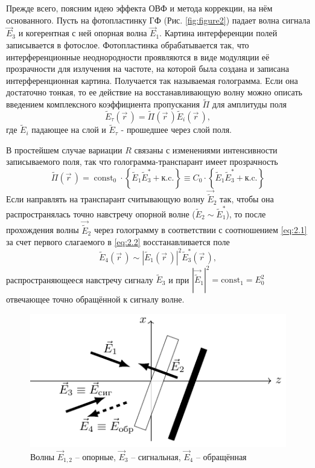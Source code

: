 Прежде всего, поясним идею эффекта ОВФ и метода коррекции, на нём основанного. Пусть на фотопластинку ГФ (Рис. \ref{fig:figure2}) падает волна сигнала $\vec{E}_3$ и когерентная с ней опорная волна $\vec{E}_1$. Картина интерференции полей записывается в фотослое. Фотопластинка обрабатывается так, что интерференционные неоднородности проявляются в виде модуляции её прозрачности для излучения на частоте, на которой была создана и записана интерференционная картина. Получается так называемая голограмма. Если она достаточно тонкая, то ее действие на восстанавливающую волну можно описать введением комплексного коэффициента пропускания $\tilde{\Pi}$ для амплитуды поля
\begin{equation}
	\label{eq:2.1}
\tilde{E}_{\tau}(\vec{r}\,)=\tilde{\Pi}(\vec{r}\,) \tilde{E}_{i}(\vec{r}\,),
\end{equation}
где $ \tilde{E}_{i}$  падающее на слой и $ \tilde{E}_{\tau}$ - прошедшее через слой поля.

В простейшем случае вариации $R$ связаны с изменениями интенсивности записываемого поля, так что голограмма-транспарант имеет прозрачность
\begin{equation}
	\label{eq:2.2}
	\tilde{\Pi}(\vec{r}\,)=\operatorname{const}_{0} \cdot\left\{\tilde{E}_{1} \tilde{E}_{3}^{*}+\text {к.c.}\right\} \equiv C_{0} \cdot\left\{\tilde{E}_{1} \tilde{E}_{3}^{*}+\text {к.c.}\right\}
\end{equation}
Если направлять на транспарант считывающую волну $\vec{\tilde{E}}_2$ так,
 чтобы она распространялась точно навстречу опорной волне ($\tilde{E}_2 \sim \tilde{E}_1^*$), то после прохождения волны $\vec{\tilde{E}}_2$ через
  голограмму в соответствии с соотношением \eqref{eq:2.1} за счет первого слагаемого в \eqref{eq:2.2} восстанавливается поле
\begin{equation}
	\label{eq:2.3}
	\tilde{E}_{4}(\vec{r}\,) \sim\left|\tilde{E}_{1}(\vec{r}\,)\right|^{2} \tilde{E}_{3}^{*}(\vec{r}\,),
\end{equation}
распространяющееся навстречу сигналу $\tilde{E}_3$ и при $|\vec{\tilde{E}}_1|^2 = \mathrm{const}_1 = E_0^2$ отвечающее точно обращённой к сигналу волне.

\begin{figure}[h]
	\centering
	\includegraphics[scale=1.5]{fig/fig3.pdf}
	\caption{Волны $\vec{E}_{1,2}$ -- опорные, $\vec{E}_3$ -- сигнальная, $\vec{E}_4$ -- обращённая}
	\label{fig:figure3}
\end{figure}

